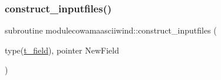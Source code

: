\mbox{\label{namespacemodulecowamaasciiwind_ab2311b5176ff0df25428cb105c33cf81}} 
\subsubsection{\texorpdfstring{construct\+\_\+inputfiles()}{construct\_inputfiles()}}
{\footnotesize\ttfamily subroutine modulecowamaasciiwind\+::construct\+\_\+inputfiles (\begin{DoxyParamCaption}\item[{type(\mbox{\hyperlink{structmodulecowamaasciiwind_1_1t__field}{t\+\_\+field}}), pointer}]{New\+Field }\end{DoxyParamCaption})\hspace{0.3cm}{\ttfamily [private]}}

